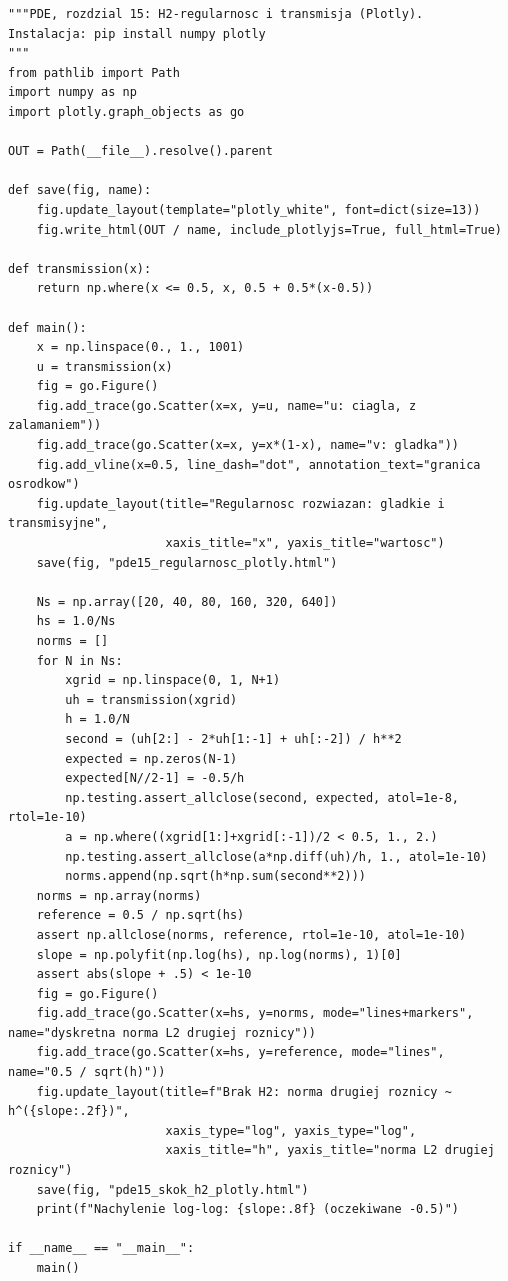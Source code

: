 \begin{lstlisting}[style=pythonpde,caption={Brak regularnosci H2 dla transmisji (Plotly)},label={code:pde15-plotly}]
"""PDE, rozdzial 15: H2-regularnosc i transmisja (Plotly).
Instalacja: pip install numpy plotly
"""
from pathlib import Path
import numpy as np
import plotly.graph_objects as go

OUT = Path(__file__).resolve().parent

def save(fig, name):
    fig.update_layout(template="plotly_white", font=dict(size=13))
    fig.write_html(OUT / name, include_plotlyjs=True, full_html=True)

def transmission(x):
    return np.where(x <= 0.5, x, 0.5 + 0.5*(x-0.5))

def main():
    x = np.linspace(0., 1., 1001)
    u = transmission(x)
    fig = go.Figure()
    fig.add_trace(go.Scatter(x=x, y=u, name="u: ciagla, z zalamaniem"))
    fig.add_trace(go.Scatter(x=x, y=x*(1-x), name="v: gladka"))
    fig.add_vline(x=0.5, line_dash="dot", annotation_text="granica osrodkow")
    fig.update_layout(title="Regularnosc rozwiazan: gladkie i transmisyjne",
                      xaxis_title="x", yaxis_title="wartosc")
    save(fig, "pde15_regularnosc_plotly.html")

    Ns = np.array([20, 40, 80, 160, 320, 640])
    hs = 1.0/Ns
    norms = []
    for N in Ns:
        xgrid = np.linspace(0, 1, N+1)
        uh = transmission(xgrid)
        h = 1.0/N
        second = (uh[2:] - 2*uh[1:-1] + uh[:-2]) / h**2
        expected = np.zeros(N-1)
        expected[N//2-1] = -0.5/h
        np.testing.assert_allclose(second, expected, atol=1e-8, rtol=1e-10)
        a = np.where((xgrid[1:]+xgrid[:-1])/2 < 0.5, 1., 2.)
        np.testing.assert_allclose(a*np.diff(uh)/h, 1., atol=1e-10)
        norms.append(np.sqrt(h*np.sum(second**2)))
    norms = np.array(norms)
    reference = 0.5 / np.sqrt(hs)
    assert np.allclose(norms, reference, rtol=1e-10, atol=1e-10)
    slope = np.polyfit(np.log(hs), np.log(norms), 1)[0]
    assert abs(slope + .5) < 1e-10
    fig = go.Figure()
    fig.add_trace(go.Scatter(x=hs, y=norms, mode="lines+markers", name="dyskretna norma L2 drugiej roznicy"))
    fig.add_trace(go.Scatter(x=hs, y=reference, mode="lines", name="0.5 / sqrt(h)"))
    fig.update_layout(title=f"Brak H2: norma drugiej roznicy ~ h^({slope:.2f})",
                      xaxis_type="log", yaxis_type="log",
                      xaxis_title="h", yaxis_title="norma L2 drugiej roznicy")
    save(fig, "pde15_skok_h2_plotly.html")
    print(f"Nachylenie log-log: {slope:.8f} (oczekiwane -0.5)")

if __name__ == "__main__":
    main()
\end{lstlisting}

